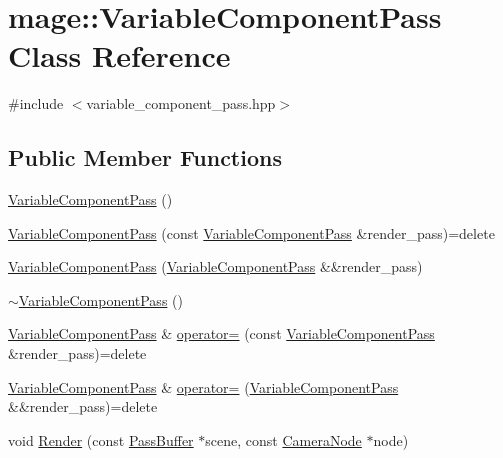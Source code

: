 \hypertarget{classmage_1_1_variable_component_pass}{}\section{mage\+:\+:Variable\+Component\+Pass Class Reference}
\label{classmage_1_1_variable_component_pass}


{\ttfamily \#include $<$variable\+\_\+component\+\_\+pass.\+hpp$>$}

\subsection*{Public Member Functions}
\begin{DoxyCompactItemize}
\item 
\hyperlink{classmage_1_1_variable_component_pass_a86224a1702761665451b3c6e78557261}{Variable\+Component\+Pass} ()
\item 
\hyperlink{classmage_1_1_variable_component_pass_a535ac4989db673e69870090494f454dd}{Variable\+Component\+Pass} (const \hyperlink{classmage_1_1_variable_component_pass}{Variable\+Component\+Pass} \&render\+\_\+pass)=delete
\item 
\hyperlink{classmage_1_1_variable_component_pass_a2721ef623ca91abfac8ae7092094a0fb}{Variable\+Component\+Pass} (\hyperlink{classmage_1_1_variable_component_pass}{Variable\+Component\+Pass} \&\&render\+\_\+pass)
\item 
\hyperlink{classmage_1_1_variable_component_pass_addf03c307a88e6a1871f0ec3adbb8bcb}{$\sim$\+Variable\+Component\+Pass} ()
\item 
\hyperlink{classmage_1_1_variable_component_pass}{Variable\+Component\+Pass} \& \hyperlink{classmage_1_1_variable_component_pass_a9df39d8323fea2b411a4f84abe8bac3c}{operator=} (const \hyperlink{classmage_1_1_variable_component_pass}{Variable\+Component\+Pass} \&render\+\_\+pass)=delete
\item 
\hyperlink{classmage_1_1_variable_component_pass}{Variable\+Component\+Pass} \& \hyperlink{classmage_1_1_variable_component_pass_ab4c2ccc632031ec51c16f7c9d500e427}{operator=} (\hyperlink{classmage_1_1_variable_component_pass}{Variable\+Component\+Pass} \&\&render\+\_\+pass)=delete
\item 
void \hyperlink{classmage_1_1_variable_component_pass_a012b74d72c3755b732d21f857f85a246}{Render} (const \hyperlink{structmage_1_1_pass_buffer}{Pass\+Buffer} $\ast$scene, const \hyperlink{classmage_1_1_camera_node}{Camera\+Node} $\ast$node)
\end{DoxyCompactItemize}

